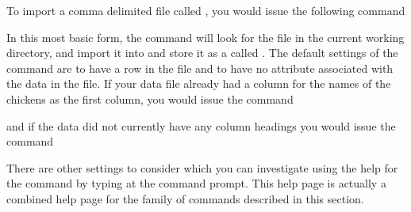 To import a comma delimited file called , you would issue the following command 
\begin{knitrout}
\color{fgcolor}\begin{kframe}
\begin{alltt}
 \hlkwb{=} \hlstd{(}\hlstd{)}
\end{alltt}
\end{kframe}
\end{knitrout}
In this most basic form, the  
 command will look for the  file in the current working directory, and import it into \R{} and store it as a  called . The default settings of the  command are to have a  row in the file and to have no  attribute associated with the data in the file. If your data file already had a column for the names of the chickens as the first column, you would issue the command 
\begin{knitrout}
\color{fgcolor}\begin{kframe}
\begin{alltt}
 \hlkwb{=} \hlstd{(}\hlstd{,} \hlstd{=}\hlstd{)}
\end{alltt}
\end{kframe}
\end{knitrout}
and if the data did not currently have any column headings you would issue the command 
\begin{knitrout}
\color{fgcolor}\begin{kframe}
\begin{alltt}
 \hlkwb{=} \hlstd{(}\hlstd{,} \hlstd{=}\hlstd{)}
\end{alltt}
\end{kframe}
\end{knitrout}
 
There are other settings to consider which you can investigate using the help for the  command by typing  at the command prompt. This help page is actually a combined help page for the family of commands described in this section. 
 

